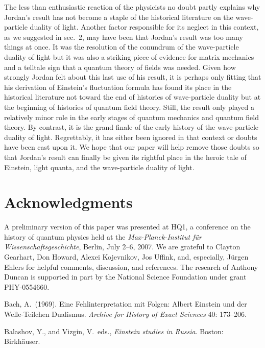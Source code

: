\documentclass[12pt]{elsart}
\begin{document}
{The less than enthusiastic reaction of the physicists no doubt partly explains why Jordan's result has not become a staple of the historical literature on the wave-particle duality of light.  Another factor responsible for its neglect in this context, as we suggested in sec.\ 2, may have been that Jordan's result was too many things at once. It was the resolution of the conundrum of the wave-particle duality of light but it was also a striking piece of evidence for matrix mechanics and a telltale sign that a quantum theory of fields was needed.  Given how strongly Jordan felt about this last use of his result, it is perhaps only fitting that his derivation of Einstein's fluctuation formula has found its place in the historical literature not  toward the end of histories of wave-particle duality but at the beginning of histories of quantum field theory.  Still, the result only played a relatively minor role in the early stages of quantum mechanics and quantum field theory.  By contrast, it is the grand finale of the early history of the wave-particle duality of light. Regrettably, it has either been ignored in that context  or doubts have been cast upon it. We hope that our paper will help remove those doubts so that Jordan's result can finally be given its rightful place in the heroic tale of Einstein, light quanta, and the wave-particle duality of light.


\section*{Acknowledgments}
  
A preliminary version of this paper was presented at HQ1, a conference on the history of quantum physics held at the {\it Max-Planck-Institut f\"ur Wissenschaftsgeschichte}, Berlin, July 2--6, 2007. We are  grateful to Clayton Gearhart, Don Howard, Alexei Kojevnikov, Jos Uffink, and, especially, J\"{u}rgen Ehlers for helpful comments, discussion, and references. The research of Anthony Duncan is supported in part by the National Science Foundation under grant PHY-0554660.


\begin{thebibliography}{}

 Bach, A.\ (1969). Eine Fehlinterpretation mit Folgen: Albert Einstein und der Welle-Teilchen Dualismus. {\it Archive for History of Exact Sciences} 40: 173--206.

 Balashov, Y., and Vizgin, V.\  eds., {\it Einstein studies in Russia}. Boston: Birkh\"{a}user.


\end{thebibliography}}
\end{document}
